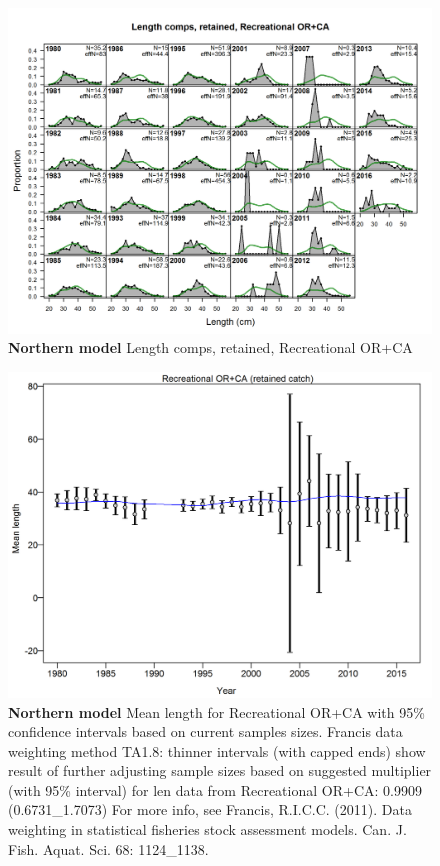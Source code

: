 \documentclass[12pt,]{article}
\begin{document}
\begin{figure}[htbp]
\centering
\includegraphics{./r4ss/plots_mod1/comp_lenfit_flt3mkt2.png}
\caption{\textbf{Northern model} Length comps, retained, Recreational
OR+CA \label{fig:mod1_14_comp_lenfit_flt3mkt2}}
\end{figure}

\begin{figure}[htbp]
\centering
\includegraphics{./r4ss/plots_mod1/comp_lenfit_data_weighting_TA1.8_Recreational OR+CA.png}
\caption{\textbf{Northern model} Mean length for Recreational OR+CA with
95\% confidence intervals based on current samples sizes. Francis data
weighting method TA1.8: thinner intervals (with capped ends) show result
of further adjusting sample sizes based on suggested multiplier (with
95\% interval) for len data from Recreational OR+CA: 0.9909
(0.6731\_1.7073) For more info, see Francis, R.I.C.C. (2011). Data
weighting in statistical fisheries stock assessment models. Can. J.
Fish. Aquat. Sci. 68: 1124\_1138.
\label{fig:mod1_17_comp_lenfit_data_weighting_TA1.8_Recreational OR+CA}}
\end{figure}
\end{document}
